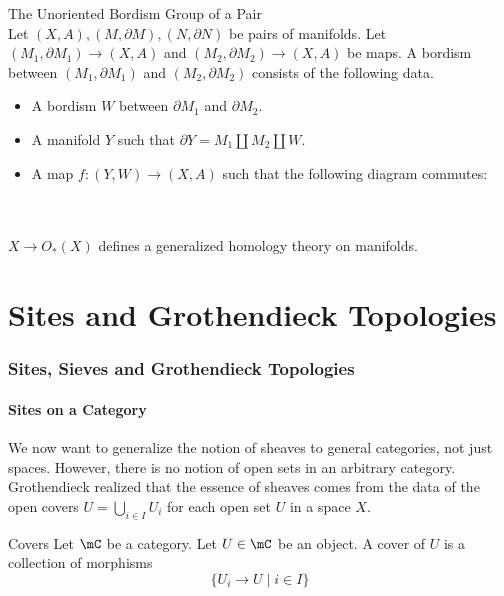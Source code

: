 \documentclass[a4paper]{article}
\begin{document}
\begin{defn}{The Unoriented Bordism Group of a Pair}{}\\
Let $(X,A),(M,\partial M),(N,\partial N)$ be pairs of manifolds. Let $(M_1,\partial M_1)\to(X,A)$ and $(M_2,\partial M_2)\to(X,A)$ be maps. A bordism between $(M_1,\partial M_1)$ and $(M_2,\partial M_2)$ consists of the following data. 
\begin{itemize}
\item A bordism $W$ between $\partial M_1$ and $\partial M_2$. 
\item A manifold $Y$ such that $\partial Y=M_1\amalg M_2\amalg W$. 
\item A map $f:(Y,W)\to(X,A)$ such that the following diagram commutes: \\
\\
\end{itemize}
\end{defn}

\begin{prp}{}{}\\
$X\to O_\ast(X)$ defines a generalized homology theory on manifolds. 
\end{prp}

\pagebreak
\part{Sites and Grothendieck Topologies}
\section{Sites, Sieves and Grothendieck Topologies}
\subsection{Sites on a Category}
We now want to generalize the notion of sheaves to general categories, not just spaces. However, there is no notion of open sets in an arbitrary category. Grothendieck realized that the essence of sheaves comes from the data of the open covers $U=\bigcup_{i\in I}U_i$ for each open set $U$ in a space $X$. 

\begin{defn}{Covers}{} Let $\mC$ be a category. Let $U\in\mC$ be an object. A cover of $U$ is a collection of morphisms $$\{U_i\to U\;|\;i\in I\}$$
\end{defn}
\end{document}
